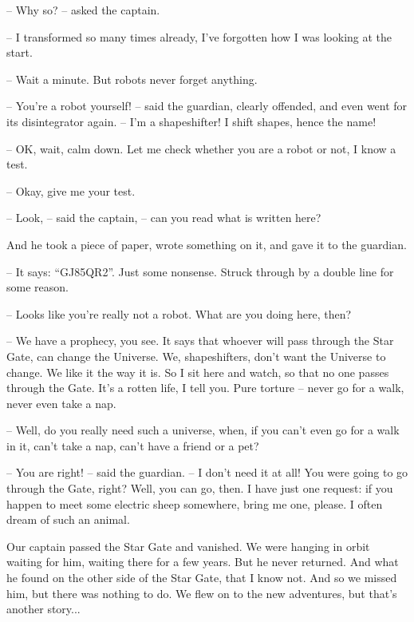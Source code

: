 \documentclass[ebook,oneside,final,openright]{memoir}
\begin{document}
– Why so? – asked the captain.\par
– I transformed so many times already, I’ve forgotten how I was looking at the start.\par
– Wait a minute. But robots never forget anything.\par
– You’re a robot yourself! – said the guardian, clearly offended, and even went for its disintegrator again. – I’m a shapeshifter! I shift shapes, hence the name!\par
– OK, wait, calm down. Let me check whether you are a robot or not, I know a test.\par
– Okay, give me your test.\par
– Look, – said the captain, – can you read what is written here?\par
And he took a piece of paper, wrote something on it, and gave it to the guardian.\par
– It says: “GJ85QR2”. Just some nonsense. Struck through by a double line for some reason.\par
– Looks like you’re really not a robot. What are you doing here, then?\par
– We have a prophecy, you see. It says that whoever will pass through the Star Gate, can change the Universe. We, shapeshifters, don’t want the Universe to change. We like it the way it is. So I sit here and watch, so that no one passes through the Gate. It’s a rotten life, I tell you. Pure torture – never go for a walk, never even take a nap.\par
– Well, do you really need such a universe, when, if you can’t even go for a walk in it, can’t take a nap, can’t have a friend or a pet?\par
– You are right! – said the guardian. – I don’t need it at all! You were going to go through the Gate, right? Well, you can go, then. I have just one request: if you happen to meet some electric sheep somewhere, bring me one, please. I often dream of such an animal.\par
Our captain passed the Star Gate and vanished. We were hanging in orbit waiting for him, waiting there for a few years. But he never returned. And what he found on the other side of the Star Gate, that I know not. And so we missed him, but there was nothing to do. We flew on to the new adventures, but that’s another story...
\end{document}
